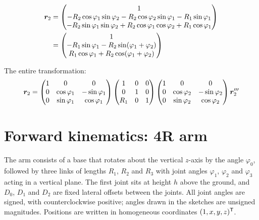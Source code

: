 \begin{align*}
  \bm{r}_2
  &= \begin{pmatrix}
       1 \\
       -R_2\cos\varphi_1\sin\varphi_2 - R_2\cos\varphi_2\sin\varphi_1
         - R_1\sin\varphi_1 \\
       -R_2\sin\varphi_1\sin\varphi_2 + R_2\cos\varphi_1\cos\varphi_2
         + R_1\cos\varphi_1
     \end{pmatrix} \\
  &= \begin{pmatrix}
       1 \\
       -R_1\sin\varphi_1 - R_2\sin(\varphi_1 + \varphi_2) \\
       R_1\cos\varphi_1 + R_2\cos(\varphi_1 + \varphi_2)
     \end{pmatrix}
\end{align*}

The entire transformation:
\[
  \bm{r}_2 =
  \begin{pmatrix}
    1 & 0 & 0 \\
    0 & \cos\varphi_1 & -\sin\varphi_1 \\
    0 & \sin\varphi_1 & \cos\varphi_1
  \end{pmatrix}
  \begin{pmatrix}
    1   & 0 & 0 \\
    0   & 1 & 0 \\
    R_1 & 0 & 1
  \end{pmatrix}
  \begin{pmatrix}
    1 & 0 & 0 \\
    0 & \cos\varphi_2 & -\sin\varphi_2 \\
    0 & \sin\varphi_2 & \cos\varphi_2
  \end{pmatrix}
  \bm{r}_2^{\prime\prime\prime}
\]


\section{Forward kinematics: 4R arm}
\label{sec:4r-fk}

The arm consists of a base that rotates about the vertical $z$-axis by
the angle $\varphi_0$, followed by three links of lengths $R_1$, $R_2$
and $R_3$ with joint angles $\varphi_1$, $\varphi_2$ and $\varphi_3$
acting in a vertical plane. The first joint sits at height $h$ above the
ground, and $D_0$, $D_1$ and $D_2$ are fixed lateral offsets between the
joints. All joint angles are signed, with counterclockwise positive;
angles drawn in the sketches are unsigned magnitudes. Positions are
written in homogeneous coordinates $(1, x, y, z)^{\mathsf{T}}$.


